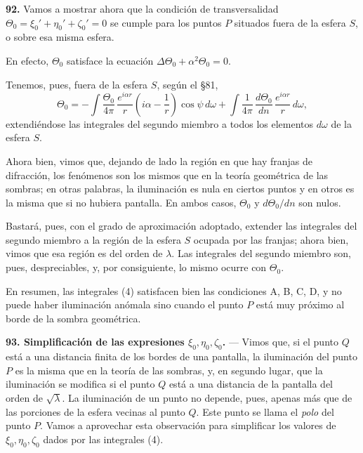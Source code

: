 \noindent\textbf{92.} Vamos a mostrar ahora que la condición de
transversalidad $\Theta_0=\xi_0'+\eta_0'+\zeta_0'=0$ se cumple para los
puntos $P$ situados fuera de la esfera $S$, o sobre esa misma esfera.

En efecto, $\Theta_0$ satisface la ecuación $\Delta\Theta_0+\alpha^2\Theta_0=0$.

Tenemos, pues, fuera de la esfera $S$, según el §81,
\[
\Theta_0 = -\int \frac{\Theta_0}{4\pi}\,\frac{e^{i\alpha r}}{r}
\left(i\alpha-\frac1r\right)\cos\psi\,d\omega +
\int \frac{1}{4\pi}\,\frac{d\Theta_0}{dn}\,\frac{e^{i\alpha r}}{r}\,d\omega,
\]
extendiéndose las integrales del segundo miembro a todos los elementos
$d\omega$ de la esfera $S$.

Ahora bien, vimos que, dejando de lado la región en que hay franjas de
difracción, los fenómenos son los mismos que en la teoría geométrica de
las sombras; en otras palabras, la iluminación es nula en ciertos puntos
y en otros es la misma que si no hubiera pantalla. En ambos casos,
$\Theta_0$ y $d\Theta_0/dn$ son nulos.

Bastará, pues, con el grado de aproximación adoptado, extender las
integrales del segundo miembro a la región de la esfera $S$ ocupada por
las franjas; ahora bien, vimos que esa región es del orden de $\lambda$.
Las integrales del segundo miembro son, pues, despreciables, y, por
consiguiente, lo mismo ocurre con $\Theta_0$.

En resumen, las integrales (4) satisfacen bien las condiciones A, B, C, D,
y no puede haber iluminación anómala sino cuando el punto $P$ está muy
próximo al borde de la sombra geométrica.

\noindent\textbf{93. Simplificación de las expresiones $\xi_0,\eta_0,\zeta_0$.}
— Vimos que, si el punto $Q$ está a una distancia finita de los bordes de
una pantalla, la iluminación del punto $P$ es la misma que en la teoría de
las sombras, y, en segundo lugar, que la iluminación se modifica si el
punto $Q$ está a una distancia de la pantalla del orden de $\sqrt{\lambda}$.
La iluminación de un punto no depende, pues, apenas más que de las
porciones de la esfera vecinas al punto $Q$. Este punto se llama el
\emph{polo} del punto $P$. Vamos a aprovechar esta observación para
simplificar los valores de $\xi_0,\eta_0,\zeta_0$ dados por las
integrales (4).

